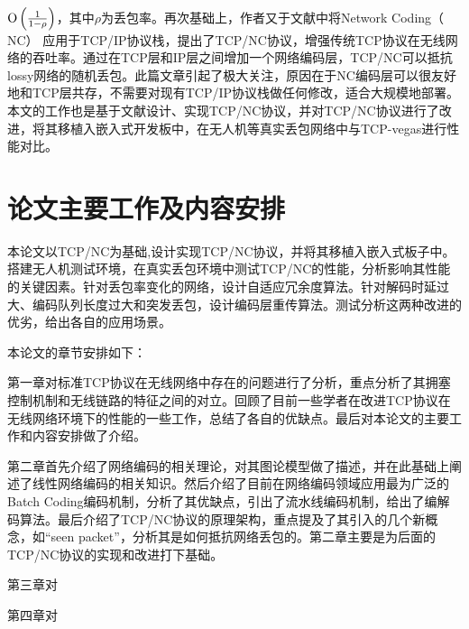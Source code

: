${\rm O}\left( {\frac{1}{{1{\rm{ - }}\rho }}} \right)$，其中$\rho$为丢包率。再次基础上，作者又于文献\cite{Sundararajan2009}中将Network Coding（ NC） 应用于TCP/IP协议栈，提出了TCP/NC协议，增强传统TCP协议在无线网络的吞吐率。通过在TCP层和IP层之间增加一个网络编码层，TCP/NC可以抵抗lossy网络的随机丢包。此篇文章引起了极大关注，原因在于NC编码层可以很友好地和TCP层共存，不需要对现有TCP/IP协议栈做任何修改，适合大规模地部署。本文的工作也是基于文献\cite{Sundararajan2009,Sundararajan2011}设计、实现TCP/NC协议，并对TCP/NC协议进行了改进，将其移植入嵌入式开发板中，在无人机等真实丢包网络中与TCP-vegas进行性能对比。

\section{论文主要工作及内容安排}
本论文以TCP/NC\textsuperscript{\cite{Sundararajan2009}}为基础,设计实现TCP/NC协议，并将其移植入嵌入式板子中。搭建无人机测试环境，在真实丢包环境中测试TCP/NC的性能，分析影响其性能的关键因素。针对丢包率变化的网络，设计自适应冗余度算法。针对解码时延过大、编码队列长度过大和突发丢包，设计编码层重传算法。测试分析这两种改进的优劣，给出各自的应用场景。
\par
本论文的章节安排如下：
\par
第一章对标准TCP协议在无线网络中存在的问题进行了分析，重点分析了其拥塞控制机制和无线链路的特征之间的对立。回顾了目前一些学者在改进TCP协议在无线网络环境下的性能的一些工作，总结了各自的优缺点。最后对本论文的主要工作和内容安排做了介绍。
\par
第二章首先介绍了网络编码的相关理论，对其图论模型做了描述，并在此基础上阐述了线性网络编码的相关知识。然后介绍了目前在网络编码领域应用最为广泛的Batch Coding编码机制，分析了其优缺点，引出了流水线编码机制，给出了编解码算法。最后介绍了TCP/NC协议的原理架构，重点提及了其引入的几个新概念，如“seen packet”，分析其是如何抵抗网络丢包的。第二章主要是为后面的TCP/NC协议的实现和改进打下基础。 
\par
第三章对
\par
第四章对

